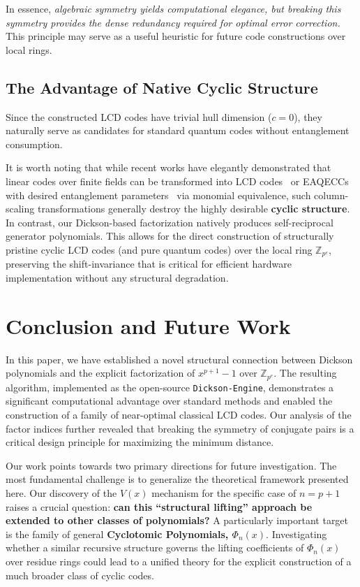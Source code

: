 \documentclass[12pt]{article}
\theoremstyle{plain}
\numberwithin{equation}{section}
\begin{document}
In essence, \textit{algebraic symmetry yields computational elegance, but breaking this symmetry provides the dense redundancy required for optimal error correction.} This principle may serve as a useful heuristic for future code constructions over local rings.

\subsection{The Advantage of Native Cyclic Structure}
Since the constructed LCD codes have trivial hull dimension ($c=0$), they naturally serve as candidates for standard quantum codes without entanglement consumption.

It is worth noting that while recent works have elegantly demonstrated that linear codes over finite fields can be transformed into LCD codes~\cite{carlet2018linear} or EAQECCs with desired entanglement parameters~\cite{anderson2024relative} via monomial equivalence, such column-scaling transformations generally destroy the highly desirable \textbf{cyclic structure}. In contrast, our Dickson-based factorization natively produces self-reciprocal generator polynomials. This allows for the direct construction of structurally pristine cyclic LCD codes (and pure quantum codes) over the local ring $\mathbb{Z}_{p^e}$, preserving the shift-invariance that is critical for efficient hardware implementation without any structural degradation.


\section{Conclusion and Future Work}

In this paper, we have established a novel structural connection between Dickson polynomials and the explicit factorization of $x^{p+1}-1$ over $\mathbb{Z}_{p^e}$. 
The resulting algorithm, implemented as the open-source \texttt{Dickson-Engine}, demonstrates a significant computational advantage over standard methods and enabled the construction of a family of near-optimal classical LCD codes. Our analysis of the factor indices further revealed that breaking the symmetry of conjugate pairs is a critical design principle for maximizing the minimum distance.

Our work points towards two primary directions for future investigation. 
The most fundamental challenge is to generalize the theoretical framework presented here. 
Our discovery of the $V(x)$ mechanism for the specific case of $n=p+1$ raises a crucial question: \textbf{can this ``structural lifting'' approach be extended to other classes of polynomials?}
A particularly important target is the family of general \textbf{Cyclotomic Polynomials, $\Phi_n(x)$}. 
Investigating whether a similar recursive structure governs the lifting coefficients of $\Phi_n(x)$ over residue rings could lead to a unified theory for the explicit construction of a much broader class of cyclic codes.
\end{document}

